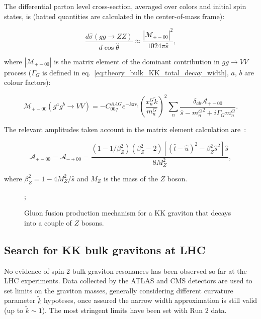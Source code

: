 \noindent The differential parton level cross-section, averaged over colors and initial spin states, is (hatted quantities are calculated in the center-of-mass frame):

\begin{equation}
\frac{d \hat{\sigma}(gg \rightarrow ZZ)}{d \cos{\hat{\theta}}} \approx \frac{ \left| \mathcal{M}_{+-00}\right|^2}{1024 \pi \hat{s}},
\label{eq:theory_parton_level_cross_section_bulk}
\end{equation}

\noindent where $\left| \mathcal{M}_{+-00}\right|$ is the matrix element of the dominant contribution in $gg \rightarrow VV$ process ($\Gamma_G$ is defined in eq.~\ref{eq:theory_bulk_KK_total_decay_width}, $a$, $b$ are colour factors):

\begin{equation}
\mathcal{M}_{+-00} (g^a g^b \rightarrow VV) = -C_{00q}^{AAG} e^{-k \pi r_c} \left( \frac{x^G_n \tilde{k}}{m_n^G}\right)^2 \sum_n \frac{\delta_{ab} \mathcal{A}_{+-00}}{\hat{s} - {m_n^G}^2 +i \Gamma_G m_n^G}.
\label{eq:theory_KK_matrix_elements}
\end{equation}

\noindent The relevant amplitudes taken account in the matrix element calculation are~\cite{Agashe:2007zd}:

\begin{equation}
\mathcal{A}_{+-00} = \mathcal{A}_{-+00} = \frac{\left( 1 - 1/\beta_Z^2 \right) \left( \beta_Z^2 -2\right) \left[ (\hat{t} - \hat{u})^2 - \beta_Z^2\hat{s}^2 \right] \hat{s} }{8 M_Z^2},
\label{eq:theory_KK_amplitudes}
\end{equation}

\noindent where $\beta_Z^2 = 1- 4M_Z^2/\hat{s}$ and $M_Z$ is the mass of the $Z$ boson.

\begin{figure}[!htb]
  \centering
{};
\caption{Gluon fusion production mechanism for a KK graviton that decays into a couple of $Z$ bosons.}
\label{fig:theory_KK_gg_prod}
\end{figure}

\subsection{Search for KK bulk gravitons at LHC}
\label{sec:theory_KK_limits_LHC}
No evidence of spin-2 bulk graviton resonances has been observed so far at the LHC experiments. Data collected by the ATLAS and CMS detectors are used to set limits on the graviton masses, generally considering different curvature parameter $\tilde{k}$ hypoteses, once assured the narrow width approximation is still valid (up to $\tilde{k} \sim 1$). The most stringent limits have been set with Run 2 data.

